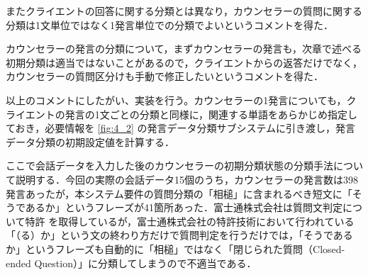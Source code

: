 \documentclass[shuuron]{kuee}
\begin{document}
またクライエントの回答に関する分類とは異なり，カウンセラーの質問に関する分類は1文単位ではなく1発言単位での分類でよいというコメントを得た．

カウンセラーの発言の分類について，まずカウンセラーの発言も，次章で述べる初期分類は適当ではないことがあるので，クライエントからの返答だけでなく，カウンセラーの質問区分けも手動で修正したいというコメントを得た．

以上のコメントにしたがい、実装を行う。カウンセラーの1発言についても，クライエントの発言の1文ごとの分類と同様に，関連する単語をあらかじめ指定しておき，必要情報を
\ref{fig:4_2}
の発言データ分類サブシステムに引き渡し，発言データ分類の初期設定値を計算する．

ここで会話データを入力した後のカウンセラーの初期分類状態の分類手法について説明する．今回の実際の会話データ15個のうち，カウンセラーの発言数は398発言あったが，本システム要件の質問分類の「相槌」に含まれるべき短文に「そうであるか」というフレーズが41箇所あった．富士通株式会社は質問文判定について特許
\cite{tokkyo}
を取得しているが，富士通株式会社の特許技術において行われている「（る）か」という文の終わり方だけで質問判定を行うだけでは，「そうであるか」というフレーズも自動的に「相槌」ではなく「閉じられた質問（Closed-ended Question）」に分類してしまうので不適当である．




\end{document}
